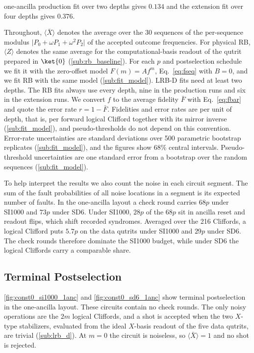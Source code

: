one-ancilla production fit over two depths gives $0.134$ and the extension fit over four depths gives $0.376$.

Throughout, $\langle \bar{X} \rangle$ denotes the average over the 30 sequences of the per-sequence modulus $\lvert P_0 + \omega P_1 + \omega^2 P_2 \rvert$ of the accepted outcome frequencies. For physical RB, $\langle Z \rangle$ denotes the same average for the computational-basis readout of the qutrit prepared in $\ket{0}$ (\autoref{sub:rb_baseline}). For each $p$ and postselection schedule we fit it with the zero-offset model $F(m) = A f^m$, Eq.~\eqref{eq:fseq} with $B = 0$, and we fit RB with the same model (\autoref{sub:fit_model}). LRB-D fits need at least two depths. The RB fits always use every depth, nine in the production runs and six in the extension runs. We convert $f$ to the average fidelity $\bar{F}$ with Eq.~\eqref{eq:fbar} and quote the error rate $r = 1 - \bar{F}$. Fidelities and error rates are per unit of depth, that is, per forward logical Clifford together with its mirror inverse (\autoref{sub:fit_model}), and pseudo-thresholds do not depend on this convention. Error-rate uncertainties are standard deviations over 500 parametric bootstrap replicates (\autoref{sub:fit_model}), and the figures show 68\% central intervals. Pseudo-threshold uncertainties are one standard error from a bootstrap over the random sequences (\autoref{sub:fit_model}).

To help interpret the results we also count the noise in each circuit segment. The sum of the fault probabilities of all noise locations in a segment is its expected number of faults. In the one-ancilla layout a check round carries $68p$ under SI1000 and $73p$ under SD6. Under SI1000, $28p$ of the $68p$ sit in ancilla reset and readout flips, which shift recorded syndromes. Averaged over the 216 Cliffords, a logical Clifford puts $5.7p$ on the data qutrits under SI1000 and $29p$ under SD6. The check rounds therefore dominate the SI1000 budget, while under SD6 the logical Cliffords carry a comparable share.

\subsection{Terminal Postselection}
\label{sub:terminal_results}

\autoref{fig:const0_si1000_1anc} and \autoref{fig:const0_sd6_1anc} show terminal postselection in the one-ancilla layout. These circuits contain no check rounds. The only noisy operations are the $2m$ logical Cliffords, and a shot is accepted when the two $X$-type stabilizers, evaluated from the ideal $X$-basis readout of the five data qutrits, are trivial (\autoref{sub:lrb_d}). At $m = 0$ the circuit is noiseless, so $\langle \bar{X} \rangle = 1$ and no shot is rejected.

